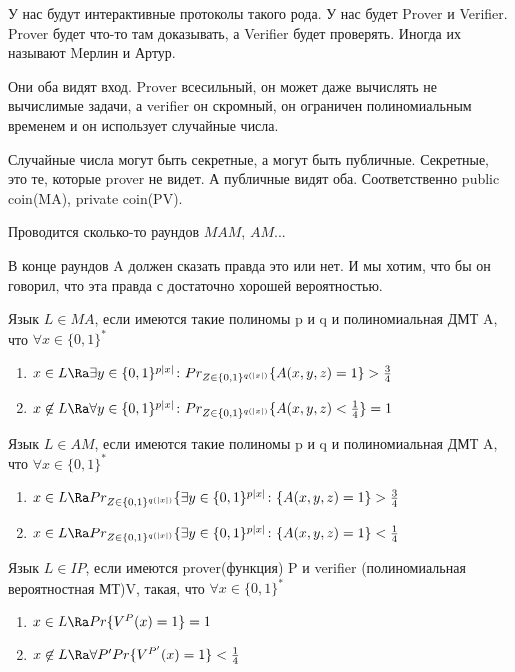 У нас будут интерактивные протоколы такого рода. У нас будет Prover и Verifier. 
Prover будет что-то там доказывать, а Verifier будет проверять. Иногда
их называют Mерлин и Артур. 

Они оба видят вход. Prover всесильный, он может даже вычислять не вычислимые задачи, а 
verifier он скромный, он ограничен полиномиальным временем и он использует случайные числа. 

Случайные числа могут быть секретные, а могут быть публичные. Секретные, это те, которые 
prover не видет. А публичные видят оба. Соответственно public coin(MA), private coin(PV).

Проводится сколько-то раундов $MAM$, $AM$... 

В конце раундов A должен сказать правда это или нет. И мы хотим, что бы 
он говорил, что эта правда с достаточно хорошей вероятностью. 

\begin{Def}
	Язык $L \in MA$, если имеются такие полиномы p и q и 
	полиномиальная ДМТ A, что $\forall x \in \{0, 1\}^*$\\
	\begin{enumerate}
	\item $x \in L \Ra \exists y \in \{0, 1\}^{p|x|} \colon Pr_{Z \in \{0, 1\}^{q(|x|)}} \{A(x, y, z) = 1\} > \frac{3}{4}$ \\
	\item  $x \not \in L \Ra \forall y \in \{0, 1\}^{p|x|} \colon Pr_{Z \in \{0, 1\}^{q(|x|)}} \{A(x, y, z) < \frac{1}{4}\} = 1$ \\
	\end{enumerate}
\end{Def}

\begin{Def}
	Язык $L \in AM$, если имеются такие полиномы p и q и 
	полиномиальная ДМТ A, что $\forall x \in \{0, 1\}^*$\\
	\begin{enumerate}
	\item $x \in L \Ra Pr_{Z \in \{0, 1\}^{q(|x|)}} \{\exists y \in \{0, 1\}^{p|x|} \colon  \{A(x, y, z) = 1\} > \frac{3}{4}$ \\
	\item $x \in L \Ra Pr_{Z \in \{0, 1\}^{q(|x|)}} \{\exists y \in \{0, 1\}^{p|x|} \colon  \{A(x, y, z) = 1\} < \frac{1}{4}$ \\
	\end{enumerate}
\end{Def}

\begin{Def}
	Язык $L \in IP$, если имеются prover(функция) P и verifier 
	(полиномиальная вероятностная МТ)V, такая, что $\forall x \in \{0, 1\}^{*}$\\
	\begin{enumerate}
	\item 
		$x \in L \Ra Pr\{V^{P}(x) = 1\} = 1$\\
	\item 
		$x \not \in L \Ra \forall P' Pr\{V^{P'}(x) = 1\} < \frac{1}{4}$\\ 
	\end{enumerate}
\end{Def}

